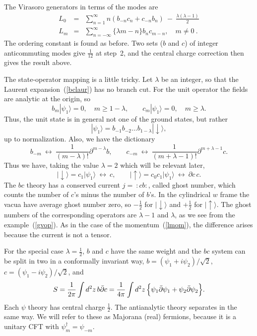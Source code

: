 The Virasoro generators in terms of the modes are
\begin{eqnarray}
L_0 &=& \sum_{n=1}^{\infty} 
n (b_{-n} c_n + c_{-n} b_n)
\ -\ \frac{\lambda(\lambda - 1)}{2} \nonumber\\
L_m &=& \sum_{n=-\infty}^{\infty} 
\{\lambda m - n \} b_n c_{m-n} , \quad m \neq 0 \ . \label{ghL}
\end{eqnarray}
The ordering constant is found as before.  Two sets
($b$ and $c$) of integer anticommuting modes give $\frac{1}{12}$
at step~2, and the central charge correction then gives the result
above.

The state-operator mapping is a little tricky.  Let
$\lambda$ be an integer, so that the Laurent
expansion~(\ref{bclaur}) has no branch cut.  For the unit operator
the fields are analytic at the origin, so
\begin{equation}
b_m |\psi_1 \rangle = 0, \quad m \geq 1-\lambda,
\qquad 
c_m |\psi_1 \rangle = 0, \quad m \geq \lambda.
\end{equation}
Thus, the unit state is in general not one of the ground states,
but rather
\begin{equation}
|\psi_1 \rangle = b_{-1} b_{-2} 
\ldots b_{1 - \lambda}|\! \downarrow \rangle,
\end{equation}
up to normalization.  Also, we have the dictionary
\begin{equation}
b_{-m}\ \leftrightarrow\ \frac{1}{(m-\lambda)!}
\partial^{m-\lambda}b, \qquad
c_{-m} \ \leftrightarrow\  \frac{1}{(m+\lambda-1)!}
\partial^{m+\lambda-1} c.
\end{equation}
Thus we have, taking the value $\lambda =
2$ which will be relevant later, 
\begin{equation}
|\! \downarrow \rangle = c_1 |\psi_1 \rangle
\ \leftrightarrow\  c, \qquad |\! \uparrow \rangle = c_0 c_1
|\psi_1 \rangle \ \leftrightarrow\  \partial c\,c.
\label{gvop}
\end{equation}
The $bc$ theory has a conserved current $j =\ :\! cb \! :$, called
ghost number, which counts the number of $c$'s minus the number of
$b$'s.  In the cylindrical $w$ frame the vacua have average ghost
number zero, so $-\frac{1}{2}$ for $|\! \downarrow \rangle$
and $+\frac{1}{2}$ for $|\! \uparrow \rangle$.  The ghost numbers
of the corresponding operators are $\lambda - 1$ and $\lambda$,
as we see from the example~(\ref{gvop}).
As in the case of the momentum~(\ref{lmom}), the difference arises
because the current is not a tensor.

For the special case $\lambda = \frac{1}{2}$, $b$ and $c$ have the
same weight and
the $bc$ system can be split in two in a conformally invariant way, 
$b = (\psi_1 + i \psi_2)/\sqrt{2}$,
$c = (\psi_1 - i \psi_2)/\sqrt{2}$, and
\begin{equation}
S = \frac{1}{2\pi} \int d^2z \, b \bar\partial c 
= \frac{1}{4\pi} \int d^2z \, \Bigl\{ \psi_1 \bar\partial \psi_1 +
\psi_2 \bar\partial \psi_2 \Bigr\}.
\end{equation}
Each $\psi$ theory has central charge $\frac{1}{2}$.
The antianalytic theory
separates in the same way.  We will refer to these as Majorana
(real)
fermions, because it is a unitary CFT with $\psi_m^\dagger =
\psi_{-m}$.

